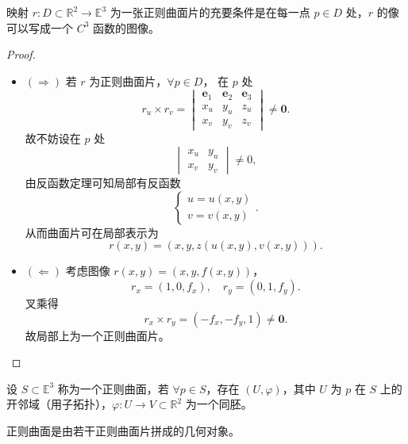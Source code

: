 \documentclass[lang=cn,10pt,thmcnt=section]{elegantbook}
\renewcommand{\vec}[1]{\mathbf{#1}}
\begin{document}
\begin{proposition}
    映射 $r: D \subset \mathbb{R}^2 \rightarrow \mathbb{E}^3$ 为一张正则曲面片的充要条件是在每一点 $p \in D$ 处，$r$ 的像可以写成一个 $C^3$ 函数的图像。
\end{proposition}
\begin{proof}
    \begin{itemize}
        \item $(\Rightarrow)$ 若 $r$ 为正则曲面片，$\forall p \in D$，
        在 $p$ 处
        $$
        r_u \times r_v = \begin{vmatrix}
        \mathbf{e}_1 & \mathbf{e}_2 & \mathbf{e}_3 \\
        x_u & y_u & z_u \\
        x_v & y_v & z_v
        \end{vmatrix} \neq \vec{0}.
        $$
        故不妨设在 $p$ 处
        $$
        \begin{vmatrix}
        x_u & y_u \\
        x_v & y_v
        \end{vmatrix} \neq 0,
        $$
        由反函数定理可知局部有反函数
        $$
        \begin{cases}
        u = u(x, y) \\
        v = v(x, y)
        \end{cases}.
        $$
        从而曲面片可在局部表示为
        $$
        r(x, y) = (x, y, z(u(x, y), v(x, y))).
        $$
    
        \item $(\Leftarrow)$ 考虑图像 $r(x, y) = (x, y, f(x, y))$，
        $$
        r_x = (1, 0, f_x), \quad r_y = (0, 1, f_y).
        $$
        叉乘得
        $$
        r_x \times r_y = (-f_x, -f_y, 1) \neq \vec{0}.
        $$
        故局部上为一个正则曲面片。  
      \end{itemize}  
\end{proof}   

\begin{definition}[正则曲面]
    设 $S \subset \mathbb{E}^3$ 称为一个正则曲面，若 $\forall p \in S$，存在 $(U, \varphi)$，其中 $U$ 为 $p$ 在 $S$ 上的开邻域（用子拓扑），$\varphi: U \rightarrow V \subset \mathbb{R}^2$ 为一个同胚。
    
    正则曲面是由若干正则曲面片拼成的几何对象。
\end{definition}
\end{document}
